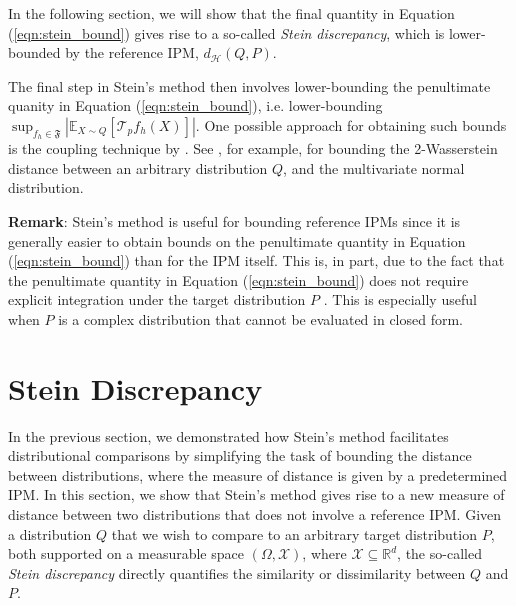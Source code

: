 In the following section, we will show that the final quantity in Equation (\ref{eqn:stein_bound}) gives rise to a so-called \textit{Stein discrepancy}, which is lower-bounded by the reference IPM, $d_{\mathcal{H}}(Q, P)$.

The final step in Stein's method then involves lower-bounding the penultimate quanity in Equation (\ref{eqn:stein_bound}), i.e. lower-bounding $\sup_{f_h \in \mathfrak{F}} \left|\mathbb{E}_{X \sim Q} \left[\mathcal{T}_p f_h(X) \right] \right|$. One possible approach for obtaining such bounds is the coupling technique by \citet{reinert_couplings}. See \citet{bonis_normal_bounds}, for example, for bounding the 2-Wasserstein distance between an arbitrary distribution $Q$, and the multivariate normal distribution.

\textbf{Remark}: Stein's method is useful for bounding reference IPMs since it is generally easier to obtain bounds on the penultimate quantity in Equation (\ref{eqn:stein_bound}) than for the IPM itself. This is, in part, due to the fact that the penultimate quantity in Equation (\ref{eqn:stein_bound}) does not require explicit integration under the target distribution $P$ \citep{gorham_sample_quality}. This is especially useful when $P$ is a complex distribution that cannot be evaluated in closed form. 



\section{Stein Discrepancy}
\label{section:2_stein_discrepancy}

In the previous section, we demonstrated how Stein's method facilitates distributional comparisons by simplifying the task of bounding the distance between distributions, where the measure of distance is given by a predetermined IPM. In this section, we show that Stein's method gives rise to a new measure of distance between two distributions that does not involve a reference IPM. Given a distribution $Q$ that we wish to compare to an arbitrary target distribution $P$, both supported on a measurable space $(\Omega, \mathcal{X})$, where $\mathcal{X} \subseteq \mathbb{R}^d$, the so-called \textit{Stein discrepancy} directly quantifies the similarity or dissimilarity between $Q$ and $P$.

